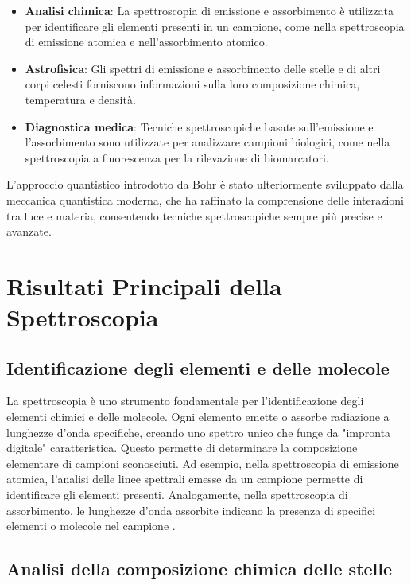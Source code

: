 \documentclass[12pt,a4paper]{report}
\begin{document}
\begin{itemize}
\item \textbf{Analisi chimica}: La spettroscopia di emissione e assorbimento è utilizzata per identificare gli elementi presenti in un campione, come nella spettroscopia di emissione atomica e nell'assorbimento atomico.
\item \textbf{Astrofisica}: Gli spettri di emissione e assorbimento delle stelle e di altri corpi celesti forniscono informazioni sulla loro composizione chimica, temperatura e densità.
\item \textbf{Diagnostica medica}: Tecniche spettroscopiche basate sull'emissione e l'assorbimento sono utilizzate per analizzare campioni biologici, come nella spettroscopia a fluorescenza per la rilevazione di biomarcatori.
\end{itemize}

L'approccio quantistico introdotto da Bohr è stato ulteriormente sviluppato dalla meccanica quantistica moderna, che ha raffinato la comprensione delle interazioni tra luce e materia, consentendo tecniche spettroscopiche sempre più precise e avanzate.

\section{Risultati Principali della Spettroscopia}

\subsection{Identificazione degli elementi e delle molecole}

La spettroscopia è uno strumento fondamentale per l'identificazione degli elementi chimici e delle molecole. Ogni elemento emette o assorbe radiazione a lunghezze d'onda specifiche, creando uno spettro unico che funge da "impronta digitale" caratteristica. Questo permette di determinare la composizione elementare di campioni sconosciuti. Ad esempio, nella spettroscopia di emissione atomica, l'analisi delle linee spettrali emesse da un campione permette di identificare gli elementi presenti. Analogamente, nella spettroscopia di assorbimento, le lunghezze d'onda assorbite indicano la presenza di specifici elementi o molecole nel campione \cite{strasburger2014spectroscopy}.

\subsection{Analisi della composizione chimica delle stelle}
\end{document}
